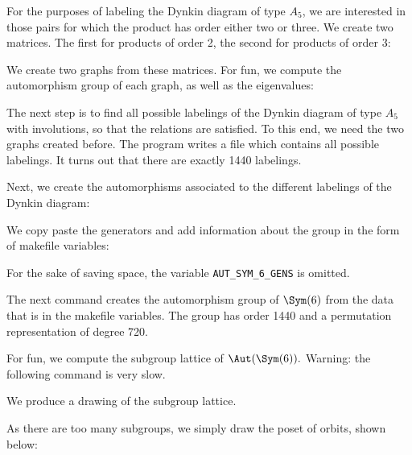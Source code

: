 
For the purposes of labeling the Dynkin diagram of type $A_5$, 
we are interested in those pairs for which the product has order either two or three. 
We create two matrices. 
The first for products of order 2, the second for products of order 3:



We create two graphs from these matrices. 
For fun, we compute the automorphism group of each graph, as well as the eigenvalues:




The next step is to find all possible labelings 
of the Dynkin diagram of type $A_5$ with involutions, 
so that the relations are satisfied. 
To this end, we need the two graphs created before. 
The program writes a file which contains all possible labelings. 
It turns out that there are exactly 1440 labelings.



Next, we create the automorphisms associated 
to the different labelings of the Dynkin diagram:



We copy paste the generators and add information about 
the group in the form of makefile variables:






For the sake of saving space, the variable \verb'AUT_SYM_6_GENS' is omitted.


The next command creates the automorphism group of $\Sym(6)$ 
from the data that is in the makefile variables. 
The group has order 1440 and a permutation representation of degree 720.



For fun, we compute the subgroup lattice of $\Aut(\Sym(6)).$ 
Warning: the following command is very slow.



We produce a drawing of the subgroup lattice.




As there are too many subgroups, we simply draw the poset of orbits, shown below:



